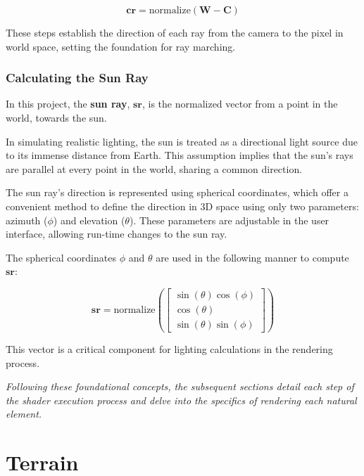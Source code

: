 \begin{equation}
   \mathbf{cr} = \text{normalize}(\mathbf{W} - \mathbf{C})
\end{equation}

These steps establish the direction of each ray from the camera to the pixel in world space, setting the foundation for ray marching.

\subsubsection{Calculating the Sun Ray}

In this project, the \textbf{sun ray}, $\mathbf{sr}$, is the normalized vector from a point in the world, towards the sun. 

In simulating realistic lighting, the sun is treated as a directional light source due to its immense distance from Earth. This assumption implies that the sun's rays are parallel at every point in the world, sharing a common direction.

The sun ray's direction is represented using spherical coordinates, which offer a convenient method to define the direction in 3D space using only two parameters: azimuth ($\phi$) and elevation ($\theta$). These parameters are adjustable in the user interface, allowing run-time changes to the sun ray.

The spherical coordinates $\phi$ and $\theta$ are used in the following manner to compute $\mathbf{sr}$:

\begin{equation}
    \mathbf{sr} = \text{normalize}\left( \begin{bmatrix} \sin(\theta) \cos(\phi) \\ \cos(\theta) \\ \sin(\theta) \sin(\phi) \end{bmatrix} \right)
\end{equation}

This vector is a critical component for lighting calculations in the rendering process.

\textit{Following these foundational concepts, the subsequent sections detail each step of the shader execution process and delve into the specifics of rendering each natural element.
}

\section{Terrain}
\label{Terrain}

